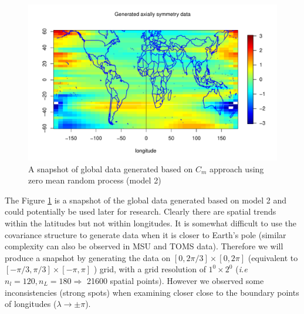 \begin{figure}[H]
	\centering
		\includegraphics [width=1\textwidth ]{graphs/Data_sample_120_model2_withmap.pdf}
		\caption[A Snapshot of Global Data Generated Based on $C_m$ Approach Using Zero]{A snapshot of global data generated based on $C_m$ approach using zero mean random process (model 2)}
		\label{grid_plot_model_2}
\end{figure}
The Figure \ref{grid_plot_model_2} is a snapshot of the global data generated based on model 2 and could potentially be used later for research. Clearly there are spatial trends within the latitudes but not within longitudes. It is somewhat difficult to use the covariance structure to generate data when it is closer to Earth's pole (similar complexity can also be observed in MSU and TOMS data). Therefore we will produce a snapshot by generating the data on $[0,2\pi/3] \times [0,2\pi]$ (equivalent to $[-\pi/3,\pi/3] \times [-\pi,\pi]$ ) grid, with a grid resolution of $1^0\times 2^0$ ({\em i.e } $n_l = 120, n_L=180 \Rightarrow$ 21600 spatial points). However we observed some inconsistencies (strong spots) when examining closer close to the boundary points of longitudes ($\lambda \rightarrow \pm \pi$).

